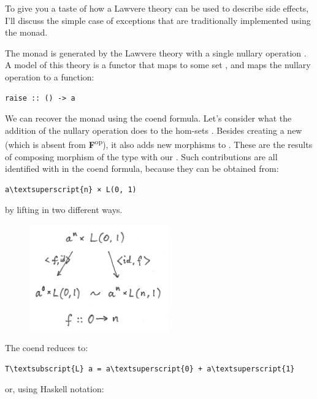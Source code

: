 To give you a taste of how a Lawvere theory can be used to describe side
effects, I'll discuss the simple case of exceptions that are
traditionally implemented using the  monad.

The  monad is generated by the Lawvere theory with a
single nullary operation . A model of this
theory is a functor that maps  to some set , and
maps the nullary operation to a function:

\begin{Verbatim}[commandchars=\\\{\}]
raise :: () -> a
\end{Verbatim}
We can recover the  monad using the coend formula. Let's
consider what the addition of the nullary operation does to the hom-sets
. Besides creating a new  (which is
absent from \textbf{F}\textsuperscript{op}), it also adds new morphisms
to . These are the results of composing morphism of the
type  with our .
Such contributions are all identified with  in
the coend formula, because they can be obtained from:

\begin{Verbatim}[commandchars=\\\{\}]
a\textsuperscript{n} × L(0, 1)
\end{Verbatim}
by lifting  in two different ways.

\begin{figure}[H]
\centering
\includegraphics[width=60mm]{images/equalize2.png}
\end{figure}

\noindent
The coend reduces to:

\begin{Verbatim}[commandchars=\\\{\}]
T\textsubscript{L} a = a\textsuperscript{0} + a\textsuperscript{1}
\end{Verbatim}
or, using Haskell notation:

